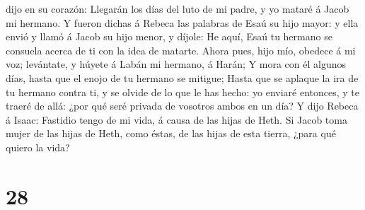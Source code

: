 dijo en su corazón: Llegarán los días del luto de mi padre, y yo mataré
á Jacob mi hermano.  Y fueron dichas á Rebeca las palabras
de Esaú su hijo mayor: y ella envió y llamó á Jacob su hijo menor, y
díjole: He aquí, Esaú tu hermano se consuela acerca de ti con la idea de
matarte.  Ahora pues, hijo mío, obedece á mi voz;
levántate, y húyete á Labán mi hermano, á Harán;  Y mora
con él algunos días, hasta que el enojo de tu hermano se mitigue;
 Hasta que se aplaque la ira de tu hermano contra ti, y se
olvide de lo que le has hecho: yo enviaré entonces, y te traeré de allá:
¿por qué seré privada de vosotros ambos en un día?  Y dijo
Rebeca á Isaac: Fastidio tengo de mi vida, á causa de las hijas de Heth.
Si Jacob toma mujer de las hijas de Heth, como éstas, de las hijas de
esta tierra, ¿para qué quiero la vida?

\hypertarget{section-27}{%
\section{28}\label{section-27}}

